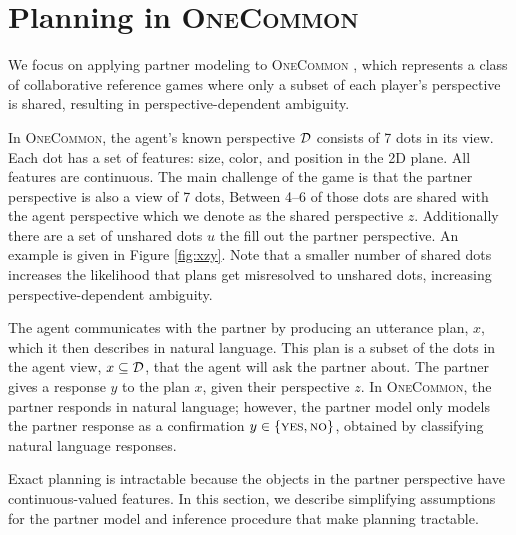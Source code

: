 \documentclass[11pt]{article}
\begin{document}
\section{Planning in \textsc{OneCommon}}
\label{sec:plan-oc}

We focus on applying partner modeling to \textsc{OneCommon} \citep{onecommon}, which represents a class of collaborative reference games \citep{mf,pb} where only a subset of each player's perspective is shared, resulting in perspective-dependent ambiguity. 

In \textsc{OneCommon}, the agent's known perspective $\mathcal{D}$ consists
of 7 dots in its view.
Each dot has a set of features: size, color, and position in the 2D plane.
All features are continuous.
The main challenge of the game is that the partner perspective is also a view of 7 dots,
Between 4--6 of those dots are shared with the agent
perspective which we denote as the shared perspective $z$.
Additionally there are a set of unshared dots $u$ the fill out the partner perspective.
An example is given in Figure \ref{fig:xzy}.
Note that a smaller number of shared dots increases the likelihood that plans get misresolved to unshared dots, increasing perspective-dependent ambiguity.

The agent communicates with the partner by producing an utterance plan, $x$, which it then describes in natural language.
This plan is a subset of the dots in the agent view, $x \subseteq\mathcal{D}$,
that the agent will ask the partner about. The partner gives a response $y$ to the plan $x$, given their perspective $z$.
In \textsc{OneCommon}, the partner responds in natural language;
however, the partner model only models the partner response as a confirmation $y\in\left\{\textsc{yes}, \textsc{no}\right\}$,
obtained by classifying natural language responses.


Exact planning is intractable because the objects in the partner perspective have continuous-valued features.
In this section, we describe simplifying assumptions for the partner model and inference procedure that make planning tractable.
\end{document}
